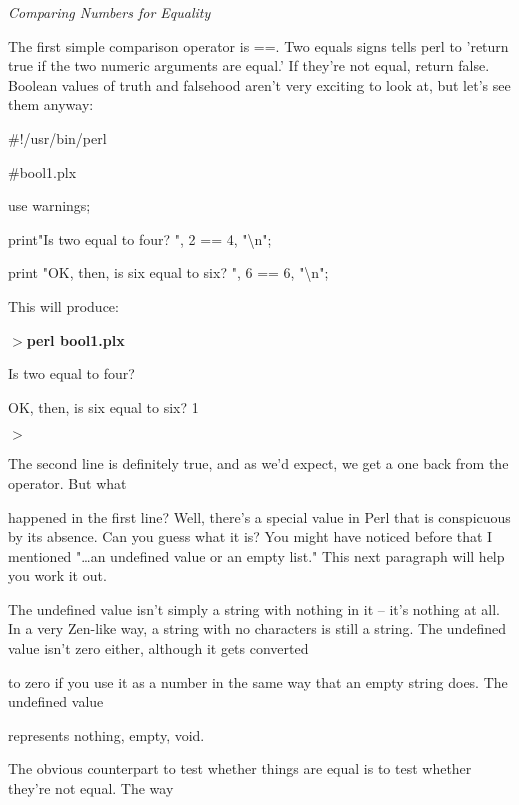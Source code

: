 \documentclass[a4paper,11pt]{book}
\begin{document}
\noindent \textit{Comparing Numbers for Equality}

\noindent The first simple comparison operator is ==. Two equals signs tells perl to 'return true if the two numeric arguments are equal.' If they're not equal, return false. Boolean values of truth and falsehood aren't very exciting to look at, but let's see them anyway:

\noindent 

\noindent \#!/usr/bin/perl

\noindent \#bool1.plx

\noindent use warnings;

\noindent print"Is two equal to four? ", 2 == 4, "\textbackslash n";

\noindent print "OK, then, is six equal to six? ", 6 == 6, "\textbackslash n";

\noindent 

\noindent This will produce:

\noindent 

\noindent $>$\textbf{perl bool1.plx}

\noindent Is two equal to four?

\noindent OK, then, is six equal to six? 1

\noindent $>$

\noindent 

\noindent 

\noindent The second line is definitely true, and as we'd expect, we get a one back from the operator. But what

\noindent happened in the first line? Well, there's a special value in Perl that is conspicuous by its absence. Can you guess what it is? You might have noticed before that I mentioned "\dots  an undefined value or an empty list." This next paragraph will help you work it out.

\noindent 

\noindent The undefined value isn't simply a string with nothing in it -- it's nothing at all. In a very Zen-like way, a string with no characters is still a string. The undefined value isn't zero either, although it gets converted

\noindent to zero if you use it as a number in the same way that an empty string does. The undefined value

\noindent represents nothing, empty, void.

\noindent 

\noindent The obvious counterpart to test whether things are equal is to test whether they're not equal. The way
\end{document}
